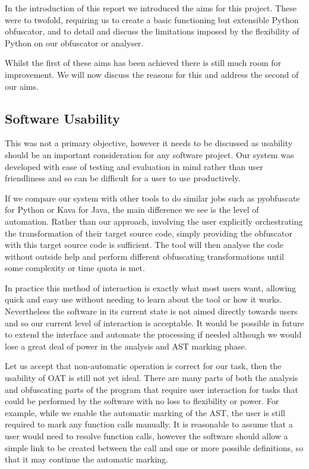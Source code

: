 \documentclass[twoside,a4paper]{report}
\begin{document}
In the introduction of this report we introduced the aims for this project. These were to twofold, requiring us to create a basic functioning but extensible
Python obfuscator, and to detail and discuss the limitations imposed by the flexibility of Python on our obfuscator or analyser.

Whilst the first of these aims has been achieved there is still much room for improvement. We will now discuss the reasons for this and address the second
of our aims.

\subsection{Software Usability}

This was not a primary objective, however it needs to be discussed as usability should be an important consideration for any software project. Our system
was developed with ease of testing and evaluation in mind rather than user friendliness and so can be difficult for a user to use productively.

If we compare our system with other tools to do similar jobs such as pyobfuscate \cite{pyobf} for Python or Kava \cite{taxobftrans} for Java, the main
difference we see is the level of automation. Rather than our approach, involving the user explicitly orchestrating the transformation of their target
source code, simply providing the obfuscator with this target source code is sufficient. The tool will then analyse the code without outside help
and perform different obfuscating transformations until some complexity or time quota is met.

In practice this method of interaction is exactly what most users want, allowing quick and easy use without needing to learn about the tool or
how it works. Nevertheless the software in its current state is not aimed directly towards users and so our current level of interaction is acceptable.
It would be possible in future to extend the interface and automate the processing if needed although we would lose a great deal of power in the analysis
and AST marking phase.

Let us accept that non-automatic operation is correct for our task, then the usability of OAT is still not yet ideal. There are many parts of both the
analysis and obfuscating parts of the program that require user interaction for tasks that could be performed by the software with no loss to flexibility or
power. For example, while we enable the automatic marking of the AST, the user is still required to mark any function calls manually. It is reasonable
to assume that a user would need to resolve function calls, however the software should allow a simple link to be created between the call and one or more
possible definitions, so that it may continue the automatic marking.
\end{document}
